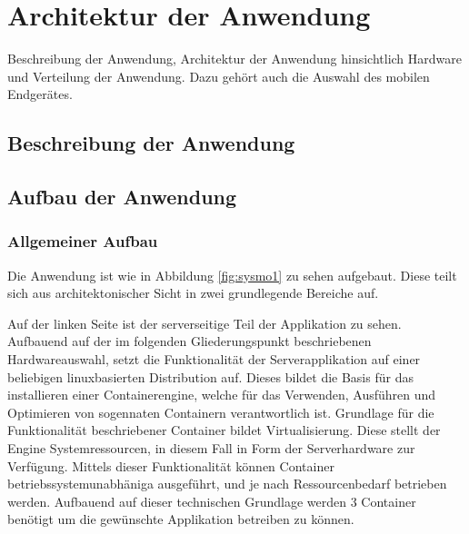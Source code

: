 \section{Architektur der Anwendung}
Beschreibung der Anwendung, Architektur der Anwendung hinsichtlich Hardware und Verteilung der Anwendung.
Dazu gehört auch die Auswahl des mobilen Endgerätes.

\subsection{Beschreibung der Anwendung}

\subsection{Aufbau der Anwendung}
\subsubsection{Allgemeiner Aufbau}
Die Anwendung ist wie in Abbildung \ref{fig:sysmo1} zu sehen aufgebaut. Diese teilt sich aus architektonischer Sicht in zwei grundlegende
Bereiche auf.

Auf der linken Seite ist der serverseitige Teil der Applikation zu sehen. Aufbauend auf der im folgenden Gliederungspunkt
beschriebenen Hardwareauswahl, setzt die Funktionalität der Serverapplikation auf einer beliebigen linuxbasierten Distribution auf. Dieses
bildet die Basis für das installieren einer Containerengine, welche für das Verwenden, Ausführen und Optimieren von sogennaten Containern 
verantwortlich ist.  
Grundlage für die Funktionalität beschriebener Container bildet Virtualisierung. Diese stellt der Engine Systemressourcen, in diesem Fall
in Form der Serverhardware zur Verfügung. Mittels dieser Funktionalität können Container betriebssystemunabhäniga ausgeführt, und je nach
Ressourcenbedarf betrieben werden. Aufbauend auf dieser technischen Grundlage werden 3 Container benötigt um die gewünschte Applikation 
betreiben zu können. 

